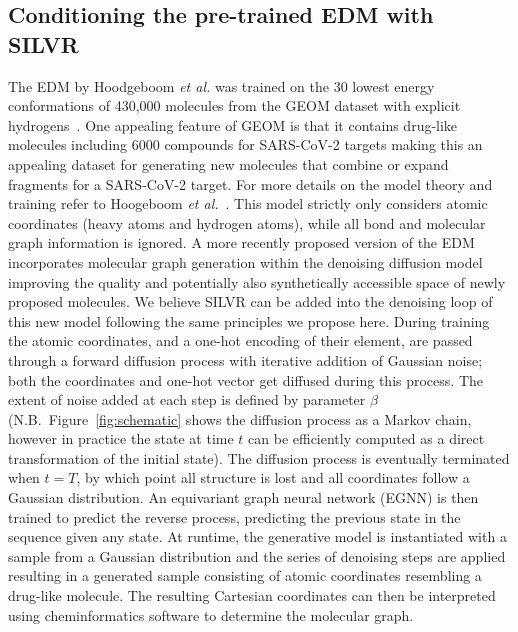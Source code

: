\documentclass[journal=jacsat,manuscript=article]{achemso}
\begin{document}
\subsection{Conditioning the pre-trained EDM with SILVR}
The EDM by Hoodgeboom \textit{et al.} was trained on the 30 lowest energy conformations of 430,000 molecules from the GEOM dataset with explicit hydrogens~\cite{axelrod2022geom}. One appealing feature of GEOM is that it contains drug-like molecules including 6000 compounds for SARS-CoV-2 targets making this an appealing dataset for generating new molecules that combine or expand fragments for a SARS-CoV-2 target. For more details on the model theory and training refer to Hoogeboom \textit{et al.}~\cite{hoogeboom2022equivariant}. This model strictly only considers atomic coordinates (heavy atoms and hydrogen atoms), while all bond and molecular graph information is ignored. A more recently proposed version of the EDM incorporates molecular graph generation within the denoising diffusion model~\cite{vignac2023midi} improving the quality and potentially also synthetically accessible space of newly proposed molecules. We believe SILVR can be added into the denoising loop of this new model following the same principles we propose here. During training the atomic coordinates, and a one-hot encoding of their element, are passed through a forward diffusion process with iterative addition of Gaussian noise; both the coordinates and one-hot vector get diffused during this process. The extent of noise added at each step is defined by parameter $\beta$ (N.B.\ Figure~\ref{fig:schematic} shows the diffusion process as a Markov chain, however in practice the state at time $t$ can be efficiently computed as a direct transformation of the initial state). The diffusion process is eventually terminated when $t=T$, by which point all structure is lost and all coordinates follow a Gaussian distribution. An equivariant graph neural network (EGNN) is then trained to predict the reverse process, predicting the previous state in the sequence given any state. At runtime, the generative model is instantiated with a sample from a Gaussian distribution and the series of denoising steps are applied resulting in a generated sample consisting of atomic coordinates resembling a drug-like molecule. The resulting Cartesian coordinates can then be interpreted using cheminformatics software to determine the molecular graph. 
\end{document}
